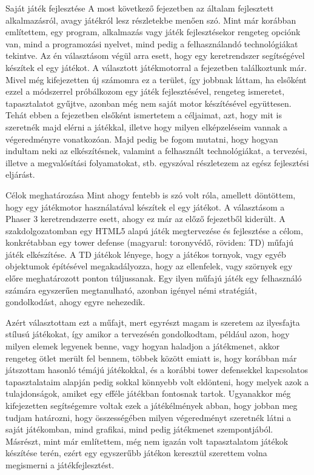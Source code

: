 \begin{MyChapter}{Saját játék fejlesztése}
	A most következő fejezetben az általam fejlesztett alkalmazásról, avagy játékról lesz részletekbe menően szó. Mint már korábban említettem, egy program, alkalmazás vagy játék fejlesztésekor rengeteg opciónk van, mind a programozási nyelvet, mind pedig a felhasználandó technológiákat tekintve. Az én választásom végül arra esett, hogy egy keretrendszer segítségével készítek el egy játékot. A választott játékmotorral a  fejezetben találkoztunk már. Mivel még kifejezetten új számomra ez a terület, így jobbnak láttam, ha elsőként ezzel a módszerrel próbálkozom egy játék fejlesztésével, rengeteg ismeretet, tapasztalatot gyűjtve, azonban még nem saját motor készítésével együttesen.
	Tehát ebben a fejezetben elsőként ismertetem a céljaimat, azt, hogy mit is szeretnék majd elérni a játékkal, illetve hogy milyen elképzeléseim vannak a végeredményre vonatkozóan. Majd pedig be fogom mutatni, hogy hogyan indultam neki az elkészítésnek, valamint a felhasznált technológiákat, a tervezési, illetve a megvalósítási folyamatokat, stb. egyszóval részletezem az egész fejlesztési eljárást.
	
	\begin{MySection}{Célok meghatározása}
		Mint ahogy fentebb is szó volt róla, amellett döntöttem, hogy egy játékmotor használatával készítek el egy játékot. A választásom a Phaser 3 keretrendszerre esett, ahogy ez már az előző fejezetből kiderült.
		A szakdolgozatomban egy HTML5 alapú játék megtervezése és fejlesztése a célom, konkrétabban egy tower defense (magyarul: toronyvédő, röviden: TD) műfajú játék elkészítése. A TD játékok lényege, hogy a játékos tornyok, vagy egyéb objektumok építésével megakadályozza, hogy az ellenfelek, vagy szörnyek egy előre meghatározott ponton túljussanak. Egy ilyen műfajú játék egy felhasználó számára egyszerűen megtanulható, azonban igényel némi stratégiát, gondolkodást, ahogy egyre nehezedik. 
		
		Azért választottam ezt a műfajt, mert egyrészt magam is szeretem az ilyesfajta stílusú játékokat, így amikor a tervezésén gondolkodtam, például azon, hogy milyen elemek legyenek benne, vagy hogyan haladjon a játékmenet, akkor rengeteg ötlet merült fel bennem, többek között emiatt is, hogy korábban már játszottam hasonló témájú játékokkal, és a korábbi tower defensekkel kapcsolatos tapasztalataim alapján pedig sokkal könnyebb volt eldönteni, hogy melyek azok a tulajdonságok, amiket egy efféle játékban fontosnak tartok. Ugyanakkor még kifejezetten segítségemre voltak ezek a játékélmények abban, hogy jobban meg tudjam határozni, hogy összességében milyen végeredményt szeretnék látni a saját játékomban, mind grafikai, mind pedig játékmenet szempontjából. Másrészt, mint már említettem, még nem igazán volt tapasztalatom játékok készítése terén, ezért egy egyszerűbb játékon keresztül szerettem volna megismerni a játékfejlesztést.
		

\end{MySection}
\end{MyChapter}
